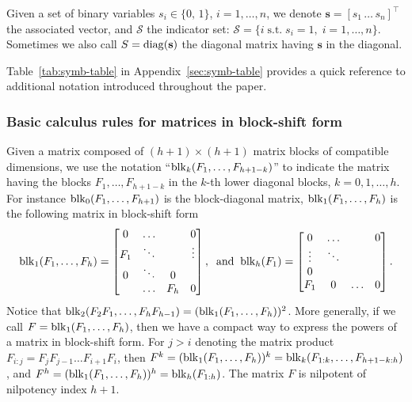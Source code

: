 \documentclass{article}
\def\diag{{\rm diag}}
\def\block{{\rm blk}}
\newcommand{\1}{\mathds{1}}
\begin{document}
Given a set of binary variables $ s_i \in \{ 0, \, 1 \}$, $ i =1, \ldots, n$, we denote $ \mathbf{s} = [s_1\, \ldots\, s_n ]^\top $ the associated vector, and $ \mathcal{S} $ the indicator set: $ \mathcal{S} =\{ i \; \text{s.t.} \; s_i =1,\; i =1, \ldots, n  \}$. Sometimes we also call $ S =\diag(\mathbf{s}) $ the diagonal matrix having $ \mathbf{s} $ in the diagonal. 

Table~\ref{tab:symb-table} in Appendix~\ref{sec:symb-table} provides a quick reference to additional notation introduced throughout the paper.

\subsubsection{Basic calculus rules for matrices in block-shift form}
\label{sec:block-shift}
Given a matrix composed of $ (h+1) \times (h+1) $ matrix blocks of compatible dimensions, we use the notation ``$ \block_k(F_1, \ldots, F_{h+1-k}) $'' to indicate the matrix having the blocks $ F_1, \ldots, F_{h+1-k} $ in the $k$-th lower diagonal blocks, $k=0,1, \ldots, h$. 
For instance $ \block_0(F_1, \ldots, F_{h+1}) $ is the block-diagonal matrix,  $ \block_1(F_1, \ldots, F_h) $ is the following matrix in block-shift form
\[
\block_1(F_1, \ldots, F_h) =
\begin{bmatrix} 0 & \ldots &  & 0 \\ 
F_1 & \ddots & & \vdots \\
0  & \ddots & 0 &  \\
  & \ldots & F_{h}& 0  \\
\end{bmatrix},
\;\; 
\text{and} \;\; 
\block_h(F_1) = \begin{bmatrix} 0 & \ldots &  & 0 \\ 
\vdots & \ddots & \\ 0 & \\
F_1 & 0 & \ldots & 0\\
\end{bmatrix}.
\]
Notice that $ \block_2(F_2 F_1, \ldots, F_h F_{h-1}  ) = (\block_1(F_1, \ldots, F_h))^2 $. More generally, if we call $ F= \block_1(F_1, \ldots, F_h)$, then we have a compact way to express the powers of a matrix in block-shift form. For $ j>i$ denoting the matrix product  $ F_{i:j} = F_j F_{j-1}\ldots F_{i+1} F_i $, then $ F^k =  (\block_1(F_1, \ldots, F_h))^k = \block_k(F_{1:k}, \ldots, F_{h+1-k:h}) $, and $ F^h =  (\block_1(F_1, \ldots, F_h))^h = \block_h(F_{1:h})  $. 
The matrix $F$ is nilpotent of nilpotency index $ h+1$. 
\end{document}
